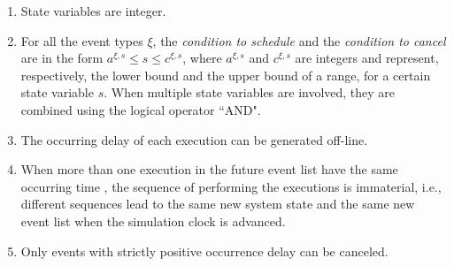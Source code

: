 \documentclass[suppldata]{interact}
\theoremstyle{plain}
\theoremstyle{definition}
\theoremstyle{remark}
\begin{document}
\begin{enumerate}
	\item State variables are integer.
	\item For all the event types $\xi$, the \textit{condition to schedule} and the \textit{condition to cancel} are in the form $a^{\xi,s}\le s \le c^{\xi,s}$, where $a^{\xi,s}$ and $c^{\xi,s}$ are integers and represent, respectively, the lower bound and the upper bound of a range, for a certain state variable $s$. When multiple state variables are involved, they are combined using the logical operator ``AND".
	\item The occurring delay of each execution can be generated off-line. %
	\item When more than one execution in the future event list have the same occurring time%
	, the sequence of performing the executions is immaterial, i.e., different sequences lead to the same new system state and the same new event list when the simulation clock is advanced.
	\item Only events with strictly positive occurrence delay can be canceled.
\end{enumerate}
\end{document}

